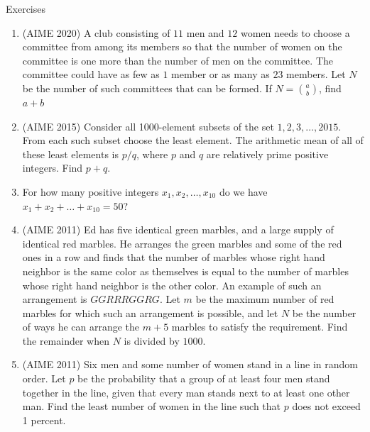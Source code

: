 \begin{xcb}{Exercises}
\begin{enumerate}
\begin{hint}
\end{hint}
\item(AIME 2020)  A club consisting of $11$ men and $12$ women needs to choose a committee from among its members so that the number of women on the committee is one more than the number of men on the committee. The committee could have as few as $1$ member or as many as $23$ members. Let $N$ be the number of such committees that can be formed. If $N=\binom{a}{b}$, find $a + b$
\begin{hint}
\end{hint}
\item (AIME 2015)  Consider all 1000-element subsets of the set ${{1, 2, 3, \dots , 2015}}$. From each such subset choose the least element. The arithmetic mean of all of these least elements is $p/q$, where $p$ and $q$ are relatively prime positive integers. Find $p + q$.
\begin{hint}
\end{hint}
\item {} For how many positive integers $x_1, x_2, \dots, x_{10}$ do we have $x_1 + x_2 + \dots + x_{10} = 50$?
\item (AIME 2011)  Ed has five identical green marbles, and a large supply of identical red marbles. He arranges the green marbles and some of the red ones in a row and finds that the number of marbles whose right hand neighbor is the same color as themselves is equal to the number of marbles whose right hand neighbor is the other color. An example of such an arrangement is $GGRRRGGRG$. Let $m$ be the maximum number of red marbles for which such an arrangement is possible, and let $N$ be the number of ways he can arrange the $m+5$ marbles to satisfy the requirement. Find the remainder when $N$ is divided by $1000$.
\begin{hint}
\end{hint}
\item (AIME 2011)  Six men and some number of women stand in a line in random order. Let $p$ be the probability that a group of at least four men stand together in the line, given that every man stands next to at least one other man. Find the least number of women in the line such that $p$ does not exceed 1 percent.

\end{enumerate}
\end{xcb}
